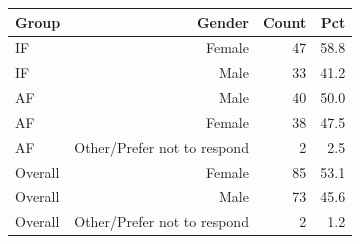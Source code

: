 \begin{tabular}{lrrr}
  \toprule
  Group & Gender & Count & Pct \\ 
  \midrule
  IF & Female & 47 & 58.8 \\ 
  IF & Male & 33 & 41.2 \\ 
  AF & Male & 40 & 50.0 \\ 
  AF & Female & 38 & 47.5 \\ 
  AF & Other/Prefer not to respond & 2 & 2.5 \\ 
  Overall & Female & 85 & 53.1 \\ 
  Overall & Male & 73 & 45.6 \\ 
  Overall & Other/Prefer not to respond & 2 & 1.2 \\ 
  \bottomrule
\end{tabular}
